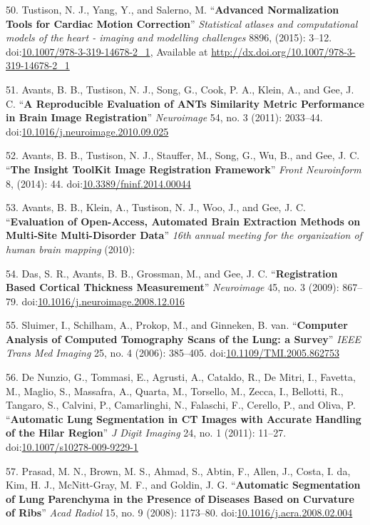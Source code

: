 \documentclass[11pt,]{article}
\begin{document}
50. Tustison, N. J., Yang, Y., and Salerno, M. ``\textbf{Advanced
Normalization Tools for Cardiac Motion Correction}'' \emph{Statistical
atlases and computational models of the heart - imaging and modelling
challenges} 8896, (2015): 3--12.
doi:\href{http://dx.doi.org/10.1007/978-3-319-14678-2_1}{10.1007/978-3-319-14678-2\_1},
Available at \url{http://dx.doi.org/10.1007/978-3-319-14678-2_1}

51. Avants, B. B., Tustison, N. J., Song, G., Cook, P. A., Klein, A.,
and Gee, J. C. ``\textbf{A Reproducible Evaluation of ANTs Similarity
Metric Performance in Brain Image Registration}'' \emph{Neuroimage} 54,
no. 3 (2011): 2033--44.
doi:\href{http://dx.doi.org/10.1016/j.neuroimage.2010.09.025}{10.1016/j.neuroimage.2010.09.025}

52. Avants, B. B., Tustison, N. J., Stauffer, M., Song, G., Wu, B., and
Gee, J. C. ``\textbf{The Insight ToolKit Image Registration Framework}''
\emph{Front Neuroinform} 8, (2014): 44.
doi:\href{http://dx.doi.org/10.3389/fninf.2014.00044}{10.3389/fninf.2014.00044}

53. Avants, B. B., Klein, A., Tustison, N. J., Woo, J., and Gee, J. C.
``\textbf{Evaluation of Open-Access, Automated Brain Extraction Methods
on Multi-Site Multi-Disorder Data}'' \emph{16th annual meeting for the
organization of human brain mapping} (2010):

54. Das, S. R., Avants, B. B., Grossman, M., and Gee, J. C.
``\textbf{Registration Based Cortical Thickness Measurement}''
\emph{Neuroimage} 45, no. 3 (2009): 867--79.
doi:\href{http://dx.doi.org/10.1016/j.neuroimage.2008.12.016}{10.1016/j.neuroimage.2008.12.016}

55. Sluimer, I., Schilham, A., Prokop, M., and Ginneken, B. van.
``\textbf{Computer Analysis of Computed Tomography Scans of the Lung: a
Survey}'' \emph{IEEE Trans Med Imaging} 25, no. 4 (2006): 385--405.
doi:\href{http://dx.doi.org/10.1109/TMI.2005.862753}{10.1109/TMI.2005.862753}

56. De Nunzio, G., Tommasi, E., Agrusti, A., Cataldo, R., De Mitri, I.,
Favetta, M., Maglio, S., Massafra, A., Quarta, M., Torsello, M., Zecca,
I., Bellotti, R., Tangaro, S., Calvini, P., Camarlinghi, N., Falaschi,
F., Cerello, P., and Oliva, P. ``\textbf{Automatic Lung Segmentation in
CT Images with Accurate Handling of the Hilar Region}'' \emph{J Digit
Imaging} 24, no. 1 (2011): 11--27.
doi:\href{http://dx.doi.org/10.1007/s10278-009-9229-1}{10.1007/s10278-009-9229-1}

57. Prasad, M. N., Brown, M. S., Ahmad, S., Abtin, F., Allen, J., Costa,
I. da, Kim, H. J., McNitt-Gray, M. F., and Goldin, J. G.
``\textbf{Automatic Segmentation of Lung Parenchyma in the Presence of
Diseases Based on Curvature of Ribs}'' \emph{Acad Radiol} 15, no. 9
(2008): 1173--80.
doi:\href{http://dx.doi.org/10.1016/j.acra.2008.02.004}{10.1016/j.acra.2008.02.004}
\end{document}
